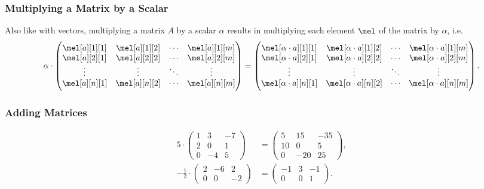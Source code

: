 \begin{frame}
  \frametitle{Multiplying a Matrix by a Scalar}
  Also like with vectors, multiplying a matrix $A$ by a scalar $\alpha$ results in multiplying each element $\mel$ of the matrix by $\alpha$, i.e.
  \begin{equation*}
    \alpha\cdot\begin{pmatrix}
      \mel[a][1][1] & \mel[a][1][2] & \cdots & \mel[a][1][m]\\
      \mel[a][2][1] & \mel[a][2][2] & \cdots & \mel[a][2][m]\\
      \vdots & \vdots & \ddots & \vdots\\
      \mel[a][n][1] & \mel[a][n][2] & \cdots & \mel[a][n][m]
    \end{pmatrix} = 
    \begin{pmatrix}
      \mel[\alpha \cdot a][1][1] & \mel[\alpha \cdot a][1][2] & \cdots & \mel[\alpha \cdot a][1][m]\\
      \mel[\alpha \cdot a][2][1] & \mel[\alpha \cdot a][2][2] & \cdots & \mel[\alpha \cdot a][2][m]\\
      \vdots & \vdots & \ddots & \vdots\\
      \mel[\alpha \cdot a][n][1] & \mel[\alpha \cdot a][n][2] & \cdots & \mel[\alpha \cdot a][n][m]
    \end{pmatrix}.
  \end{equation*}
\end{frame}

\begin{frame}
  \frametitle{Adding Matrices}
  \begin{presentation_example}
    \begin{align*}
      5\cdot\begin{pmatrix}
        1 & 3 & -7\\
        2 & 0 & 1\\
        0 & -4 & 5
      \end{pmatrix} &=
      \begin{pmatrix}
        5 & 15 & -35\\
        10 & 0 & 5\\
        0 & -20 & 25
      \end{pmatrix},\\[5mm]
      -\frac{1}{2}\cdot\begin{pmatrix}
        2 & -6 & 2\\
        0 & 0 & -2
      \end{pmatrix} &=
      \begin{pmatrix}
        -1 & 3 & -1\\
        0 & 0 & 1
      \end{pmatrix}.
    \end{align*}
  \end{presentation_example}
\end{frame}

